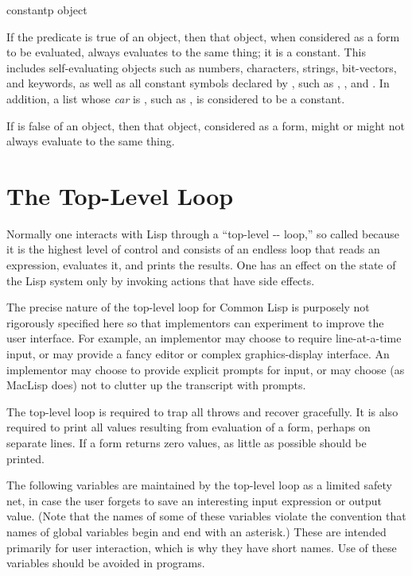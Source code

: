 \begin{defun}[Function]
constantp object

If the predicate  is true of an object,
then that object, when considered as a form to
be evaluated, always evaluates to the same thing;
it is a constant.
This includes self-evaluating objects such as numbers, characters,
strings, bit-vectors, and keywords, as well as all constant symbols
declared by ,
such as , , and .
In addition, a list whose \emph{car} is ,
such as , is considered to be a constant.

If  is false of an object, then
that object, considered as a form,
might or might not always evaluate to the same thing.
\end{defun}

\section{The Top-Level Loop}

Normally one interacts with Lisp through a ``top-level
-- loop,'' so called because
it is the highest level of control and consists of an endless
loop that reads an expression, evaluates it, and prints the
results.  One has an effect on the state of the Lisp system
only by invoking actions that have side effects.

The precise nature of the top-level loop for Common Lisp
is purposely not rigorously specified here so that implementors can
experiment to improve the user interface.
For example, an implementor may choose to require line-at-a-time
input, or may provide a fancy editor or complex graphics-display
interface.  An implementor may choose to provide
explicit prompts for input,
or may choose (as MacLisp does) not to clutter up the transcript
with prompts.

The top-level loop is required to trap all throws and recover gracefully.
It is also required to print all values resulting from evaluation of a form,
perhaps on separate lines.  If a form returns zero values, as little
as possible should be printed.

The following variables are maintained by the top-level loop
as a limited safety net, in case the user forgets to save an interesting input
expression or output value.  (Note that the names of some of these variables
violate the convention that names of global variables begin and end with
an asterisk.)  These are intended primarily for user interaction, which is why
they have short names.  Use of these variables should be avoided in programs.

